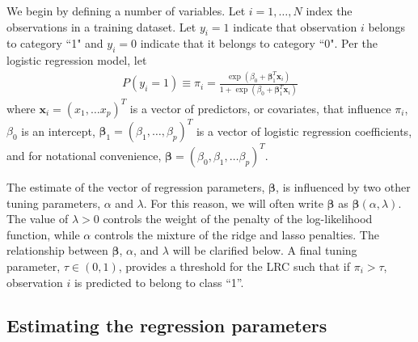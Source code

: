 \documentclass{article}
\begin{document}
We begin by defining a
number of variables.  Let $i = 1,\ldots,N$ index the observations in a training dataset. 
Let $y_i = 1$ indicate that observation $i$ belongs to category ``1" and $y_i = 0$ indicate
that it belongs to category ``0".  Per the logistic regression model, let  
\begin{align}
P(y_i = 1) \equiv \pi_i = 
\frac{\exp(\beta_0 + \boldsymbol{\beta}_1^T \mathbf{x}_i)}{1+\exp(\beta_0 + \boldsymbol{\beta}_1^T \mathbf{x}_i)}
\end{align}
\noindent where $\mathbf{x}_i = (x_1, \ldots x_p)^T$ is a vector of predictors, or covariates, that
influence $\pi_i$, $\beta_0$ is an intercept, $\boldsymbol{\beta}_1 = (\beta_1, \ldots, \beta_p)^T$ is a 
vector of logistic regression coefficients, and for notational convenience, 
$\boldsymbol{\beta} = (\beta_0, \beta_1, \ldots \beta_p)^T$. 

The estimate of the vector of regression parameters, $\boldsymbol{\beta}$, is influenced by two other tuning parameters, 
$\alpha$ and $\lambda$.  For this reason, we will often write $\boldsymbol\beta$ as $\boldsymbol\beta(\alpha,\lambda)$.  
The value of $\lambda > 0$ controls the weight of the
penalty of the log-likelihood function, while $\alpha$ controls the mixture of the ridge and lasso penalties.  
The relationship between $\boldsymbol{\beta}$, $\alpha$, and $\lambda$ will be clarified below.  A final tuning parameter, 
$\tau \in (0, 1)$, provides a threshold for the LRC such that if $\pi_i > \tau$, observation $i$ is predicted to belong
to class ``1''.

\subsection{Estimating the regression parameters}
\end{document}

